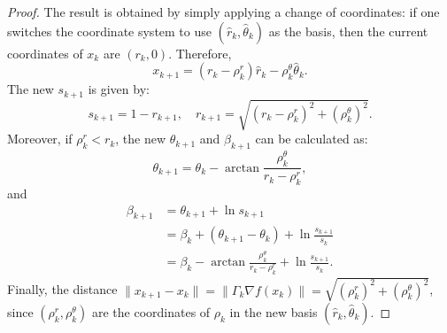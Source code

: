 \documentclass{article}
\theoremstyle{plain}
\theoremstyle{definition}
\theoremstyle{remark}
\begin{document}
\begin{proof}
    The result is obtained by simply applying a change of coordinates: if one switches the coordinate system to use $(\hat{r}_k, \hat{\theta}_k)$ as the basis, then the current coordinates of $x_k$ are $(r_k, 0)$. Therefore,
    \begin{equation*}
        x_{k+1} = (r_k - \rho^r_k) \hat{r}_k - \rho_k^\theta \hat{\theta}_k.
    \end{equation*}
    The new $s_{k+1}$ is given by:
    \begin{equation*}
        s_{k + 1} = 1 - r_{k + 1}, \quad r_{k + 1} = \sqrt{(r_k - \rho_k^r)^2 + (\rho_k^\theta)^2}.
    \end{equation*}
    Moreover, if $\rho_k^r < r_k$, the new $\theta_{k+1}$ and $\beta_{k+1}$ can be calculated as:
    \begin{equation*}
        \theta_{k + 1} = \theta_k - \arctan \frac{\rho_k^\theta}{r_k - \rho^r_k},
    \end{equation*}
    and
    \begin{equation*}
        \begin{aligned}
            \beta_{k + 1} &= \theta_{k + 1} + \ln s_{k + 1} \\
            &= \beta_k + (\theta_{k + 1} - \theta_k) + \ln \frac{s_{k + 1}}{s_k}\\
            &= \beta_k - \arctan \frac{\rho_k^\theta}{r_k - \rho^r_k} + \ln \frac{s_{k + 1}}{s_k}.
        \end{aligned}
    \end{equation*}
    Finally, the distance $\|x_{k+1} - x_k\| = \|\Gamma_k \nabla f(x_k)\| = \sqrt{(\rho_k^r)^2 + (\rho_k^\theta)^2}$, since $(\rho_k^r, \rho_k^\theta)$ are the coordinates of $\rho_k$ in the new basis $(\hat{r}_k, \hat{\theta}_k)$.
\end{proof}
\end{document}
